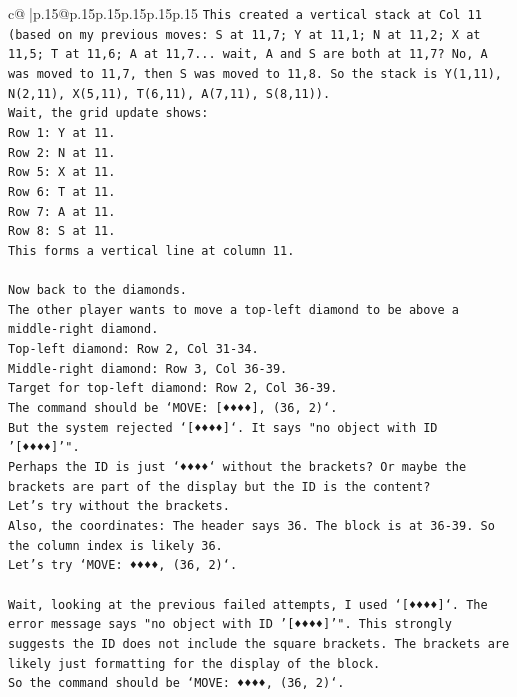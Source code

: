 \documentclass{article}
\begin{document}
{\begin{supertabular}{c@{$\;$}|p{.15\linewidth}@{}p{.15\linewidth}p{.15\linewidth}p{.15\linewidth}p{.15\linewidth}p{.15\linewidth}}
{{{\texttt{This created a vertical stack at Col 11 (based on my previous moves: S at 11,7; Y at 11,1; N at 11,2; X at 11,5; T at 11,6; A at 11,7... wait, A and S are both at 11,7? No, A was moved to 11,7, then S was moved to 11,8. So the stack is Y(1,11), N(2,11), X(5,11), T(6,11), A(7,11), S(8,11)).} \\
\texttt{Wait, the grid update shows:} \\
\texttt{Row 1: Y at 11.} \\
\texttt{Row 2: N at 11.} \\
\texttt{Row 5: X at 11.} \\
\texttt{Row 6: T at 11.} \\
\texttt{Row 7: A at 11.} \\
\texttt{Row 8: S at 11.} \\
\texttt{This forms a vertical line at column 11.} \\
\\ 
\texttt{Now back to the diamonds.} \\
\texttt{The other player wants to move a top{-}left diamond to be above a middle{-}right diamond.} \\
\texttt{Top{-}left diamond: Row 2, Col 31{-}34.} \\
\texttt{Middle{-}right diamond: Row 3, Col 36{-}39.} \\
\texttt{Target for top{-}left diamond: Row 2, Col 36{-}39.} \\
\texttt{The command should be `MOVE: {[}♦♦♦♦{]}, (36, 2)`.} \\
\texttt{But the system rejected `{[}♦♦♦♦{]}`. It says "no object with ID '{[}♦♦♦♦{]}'".} \\
\texttt{Perhaps the ID is just `♦♦♦♦` without the brackets? Or maybe the brackets are part of the display but the ID is the content?} \\
\texttt{Let's try without the brackets.} \\
\texttt{Also, the coordinates: The header says 36. The block is at 36{-}39. So the column index is likely 36.} \\
\texttt{Let's try `MOVE: ♦♦♦♦, (36, 2)`.} \\
\\ 
\texttt{Wait, looking at the previous failed attempts, I used `{[}♦♦♦♦{]}`. The error message says "no object with ID '{[}♦♦♦♦{]}'". This strongly suggests the ID does not include the square brackets. The brackets are likely just formatting for the display of the block.} \\
\texttt{So the command should be `MOVE: ♦♦♦♦, (36, 2)`.} \\
}}}
\end{supertabular}}
\end{document}
